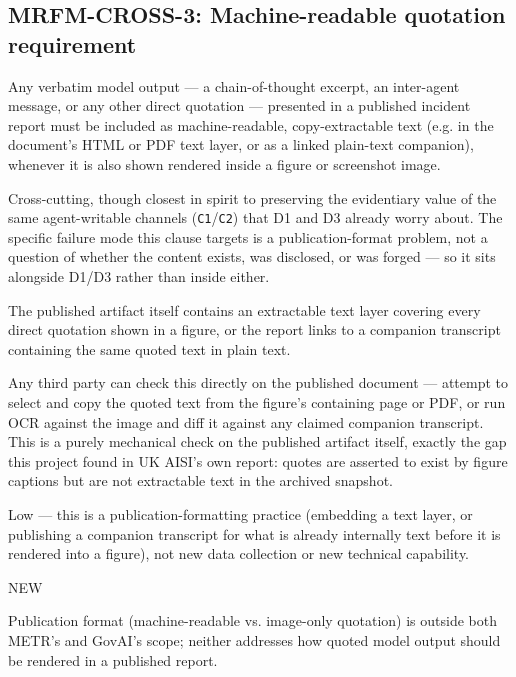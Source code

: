 \subsection*{MRFM-CROSS-3: Machine-readable quotation requirement}
\begin{description}[leftmargin=2.2cm, style=nextline]
\item[Requirement] Any verbatim model output --- a chain-of-thought excerpt, an inter-agent message, or any other direct quotation --- presented in a published incident report must be included as machine-readable, copy-extractable text (e.g. in the document's HTML or PDF text layer, or as a linked plain-text companion), whenever it is also shown rendered inside a figure or screenshot image.
\item[Degradation defended] Cross-cutting, though closest in spirit to preserving the evidentiary value of the same agent-writable channels (\texttt{C1}/\texttt{C2}) that D1 and D3 already worry about. The specific failure mode this clause targets is a publication-format problem, not a question of whether the content exists, was disclosed, or was forged --- so it sits alongside D1/D3 rather than inside either.
\item[Evidence required] The published artifact itself contains an extractable text layer covering every direct quotation shown in a figure, or the report links to a companion transcript containing the same quoted text in plain text.
\item[Verifier (no lab network access needed)] Any third party can check this directly on the published document --- attempt to select and copy the quoted text from the figure's containing page or PDF, or run OCR against the image and diff it against any claimed companion transcript. This is a purely mechanical check on the published artifact itself, exactly the gap this project found in UK AISI's own report: quotes are asserted to exist by figure captions but are not extractable text in the archived snapshot.
\item[Cost band] Low --- this is a publication-formatting practice (embedding a text layer, or publishing a companion transcript for what is already internally text before it is rendered into a figure), not new data collection or new technical capability.
\item[vs. prior art] NEW
\item[Prior-art note] Publication format (machine-readable vs. image-only quotation) is outside both METR's and GovAI's scope; neither addresses how quoted model output should be rendered in a published report.
\end{description}

